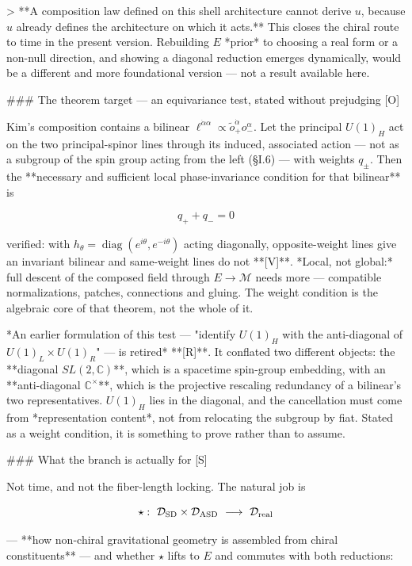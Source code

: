 > **A composition law defined on this shell architecture cannot derive $u$, because $u$ already defines the architecture on which it acts.** This closes the chiral route to time in the present version. Rebuilding $E$ *prior* to choosing a real form or a non-null direction, and showing a diagonal reduction emerges dynamically, would be a different and more foundational version — not a result available here.

### The theorem target — an equivariance test, stated without prejudging [O]

Kim's composition contains a bilinear $\ell^{\dot\alpha\alpha}\propto\tilde o_+^{\dot\alpha}o_-^{\alpha}$. Let the principal $U(1)_H$ act on the two principal-spinor lines through its induced, associated action — not as a subgroup of the spin group acting from the left (§I.6) — with weights $q_\pm$. Then the **necessary and sufficient local phase-invariance condition for that bilinear** is

$$\boxed{\ q_+ + q_- = 0\ }$$

verified: with $h_\theta = \operatorname{diag}(e^{i\theta},e^{-i\theta})$ acting diagonally, opposite-weight lines give an invariant bilinear and same-weight lines do not **[V]**. *Local, not global:* full descent of the composed field through $E\to\mathcal{M}$ needs more — compatible normalizations, patches, connections and gluing. The weight condition is the algebraic core of that theorem, not the whole of it.

*An earlier formulation of this test — "identify $U(1)_H$ with the anti-diagonal of $U(1)_L\times U(1)_R$" — is retired* **[R]**. It conflated two different objects: the **diagonal $SL(2,\mathbb{C})$**, which is a spacetime spin-group embedding, with an **anti-diagonal $\mathbb{C}^\times$**, which is the projective rescaling redundancy of a bilinear's two representatives. $U(1)_H$ lies in the diagonal, and the cancellation must come from *representation content*, not from relocating the subgroup by fiat. Stated as a weight condition, it is something to prove rather than to assume.

### What the branch is actually for [S]

Not time, and not the fiber-length locking. The natural job is

$$\star:\ \mathcal{D}_{\rm SD}\times\mathcal{D}_{\rm ASD}\ \longrightarrow\ \mathcal{D}_{\rm real}$$

— **how non-chiral gravitational geometry is assembled from chiral constituents** — and whether $\star$ lifts to $E$ and commutes with both reductions:

